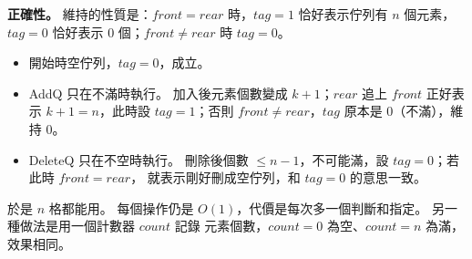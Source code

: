 \begin{pastsoln}
\textbf{正確性。} 維持的性質是：$\mathit{front} = \mathit{rear}$ 時，$\mathit{tag} = 1$ 恰好表示佇列有 $n$ 個元素，
$\mathit{tag} = 0$ 恰好表示 $0$ 個；$\mathit{front} \ne \mathit{rear}$ 時 $\mathit{tag} = 0$。
\begin{itemize}
\item 開始時空佇列，$\mathit{tag} = 0$，成立。
\item AddQ 只在不滿時執行。 加入後元素個數變成 $k + 1$；$\mathit{rear}$ 追上 $\mathit{front}$ 正好表示 $k + 1 = n$，此時設
$\mathit{tag} = 1$；否則 $\mathit{front} \ne \mathit{rear}$，$\mathit{tag}$ 原本是 $0$（不滿），維持 $0$。
\item DeleteQ 只在不空時執行。 刪除後個數 $\le n - 1$，不可能滿，設 $\mathit{tag} = 0$；若此時 $\mathit{front} = \mathit{rear}$，
就表示剛好刪成空佇列，和 $\mathit{tag} = 0$ 的意思一致。
\end{itemize}
於是 $n$ 格都能用。 每個操作仍是 $O(1)$，代價是每次多一個判斷和指定。 另一種做法是用一個計數器 $\mathit{count}$ 記錄
元素個數，$\mathit{count} = 0$ 為空、$\mathit{count} = n$ 為滿，效果相同。
\end{pastsoln}

